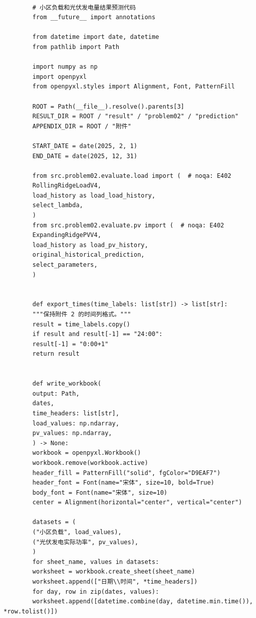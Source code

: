 \documentclass[UTF8]{ctexart}
\begin{document}
    \begin{verbatim}
        
        # 小区负载和光伏发电量结果预测代码
        from __future__ import annotations
        
        from datetime import date, datetime
        from pathlib import Path
        
        import numpy as np
        import openpyxl
        from openpyxl.styles import Alignment, Font, PatternFill
        
        ROOT = Path(__file__).resolve().parents[3]
        RESULT_DIR = ROOT / "result" / "problem02" / "prediction"
        APPENDIX_DIR = ROOT / "附件"
        
        START_DATE = date(2025, 2, 1)
        END_DATE = date(2025, 12, 31)
        
        from src.problem02.evaluate.load import (  # noqa: E402
        RollingRidgeLoadV4,
        load_history as load_load_history,
        select_lambda,
        )
        from src.problem02.evaluate.pv import (  # noqa: E402
        ExpandingRidgePVV4,
        load_history as load_pv_history,
        original_historical_prediction,
        select_parameters,
        )
        
        
        def export_times(time_labels: list[str]) -> list[str]:
        """保持附件 2 的时间列格式。"""
        result = time_labels.copy()
        if result and result[-1] == "24:00":
        result[-1] = "0:00+1"
        return result
        
        
        def write_workbook(
        output: Path,
        dates,
        time_headers: list[str],
        load_values: np.ndarray,
        pv_values: np.ndarray,
        ) -> None:
        workbook = openpyxl.Workbook()
        workbook.remove(workbook.active)
        header_fill = PatternFill("solid", fgColor="D9EAF7")
        header_font = Font(name="宋体", size=10, bold=True)
        body_font = Font(name="宋体", size=10)
        center = Alignment(horizontal="center", vertical="center")
        
        datasets = (
        ("小区负载", load_values),
        ("光伏发电实际功率", pv_values),
        )
        for sheet_name, values in datasets:
        worksheet = workbook.create_sheet(sheet_name)
        worksheet.append(["日期\\时间", *time_headers])
        for day, row in zip(dates, values):
        worksheet.append([datetime.combine(day, datetime.min.time()), *row.tolist()])
        

\end{verbatim}
\end{document}
